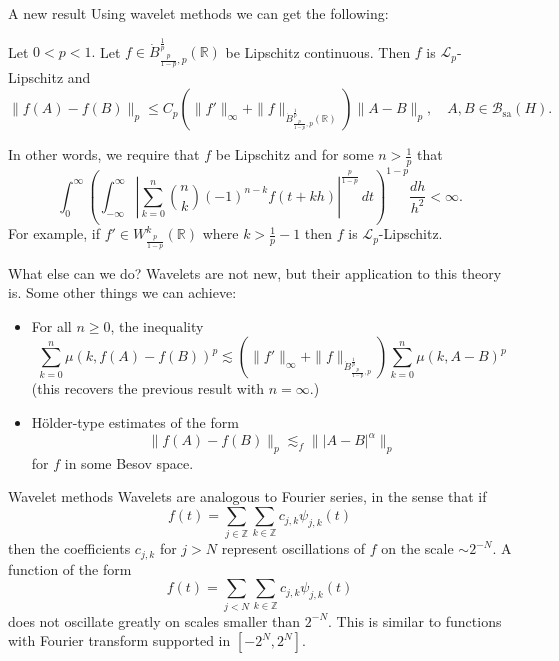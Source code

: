 \documentclass{beamer}
\numberwithin{equation}{section}
\theoremstyle{plain}
\theoremstyle{plain}
\theoremstyle{definition}
\theoremstyle{plain}
\theoremstyle{plain}
\theoremstyle{definition}
\newcommand{\Rl}{\mathbb{R}}
\newcommand{\Itgr}{\mathbb{Z}}
\newcommand{\Bc}{\mathcal{B}}
\newcommand{\Lc}{\mathcal{L}}
\newcommand{\sa}{\mathrm{sa}}
\begin{document}
\begin{frame}{A new result}
    Using wavelet methods we can get the following:
    \begin{theorem}
        Let $0 < p < 1.$ Let $f \in \dot{B}^{\frac1p}_{\frac{p}{1-p},p}(\Rl)$ be Lipschitz continuous. Then $f$ is $\Lc_p$-Lipschitz and
        $$
            \|f(A)-f(B)\|_p \leq C_{p}(\|f'\|_\infty+\|f\|_{\dot{B}^{\frac1p}_{\frac{p}{1-p},p}(\Rl)})\|A-B\|_p,\quad A,B\in \Bc_{\sa}(H).
        $$
    \end{theorem}
    \pause
    In other words, we require that $f$ be Lipschitz and for some $n>\frac1p$ that
    \begin{equation*}
        \int_0^\infty \left(\int_{-\infty}^\infty \left|\sum_{k=0}^n \binom{n}{k}(-1)^{n-k}f(t+kh)\right|^{\frac{p}{1-p}}\,dt\right)^{1-p} \frac{dh}{h^2} < \infty.
    \end{equation*}
    \pause
    For example, if $f' \in W^{k}_{\frac{p}{1-p}}(\Rl)$ where $k > \frac{1}{p}-1$ then $f$ is $\Lc_p$-Lipschitz.
\end{frame}

\begin{frame}{What else can we do?}
    Wavelets are not new, but their application to this theory is. \pause
    Some other things we can achieve:
    \begin{itemize}
        \item{} For all $n\geq 0$, the inequality
        $$
            \sum_{k=0}^n \mu(k,f(A)-f(B))^p \lesssim (\|f'\|_\infty+\|f\|_{\dot{B}^{\frac{1}{p}}_{\frac{p}{1-p},p}})\sum_{k=0}^n \mu(k,A-B)^p
        $$
        (this recovers the previous result with $n=\infty.$)\pause
        \item{} H\"older-type estimates of the form
        $$
            \|f(A)-f(B)\|_{p} \lesssim_f \||A-B|^{\alpha}\|_p
        $$
        for $f$ in some Besov space.
    \end{itemize}
\end{frame}

\begin{frame}{Wavelet methods}
    Wavelets are analogous to Fourier series, in the sense that if
    \[
        f(t) = \sum_{j\in \Itgr} \sum_{k\in \Itgr} c_{j,k}\psi_{j,k}(t)
    \]
    then the coefficients $c_{j,k}$ for $j>N$ represent oscillations of $f$ on the scale $\sim 2^{-N}.$ A function of the form
    \[
        f(t) = \sum_{j<N} \sum_{k\in \Itgr}c_{j,k}\psi_{j,k}(t)
    \]
    does not oscillate greatly on scales smaller than $2^{-N}.$ This is similar to functions with Fourier transform supported in $[-2^N,2^N].$
\end{frame}
\end{document}

